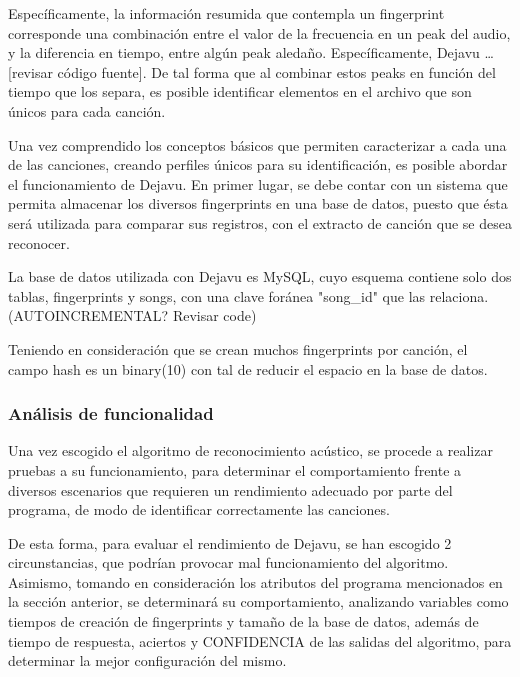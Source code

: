 \bigskip

Específicamente, la información resumida que contempla un fingerprint corresponde una combinación entre el valor de la frecuencia en un peak del audio, y la diferencia en tiempo, entre algún peak aledaño. Específicamente, Dejavu …[revisar código fuente]. De tal forma que al combinar estos peaks en función del tiempo que los separa, es posible identificar elementos en el archivo que son únicos para cada canción.

\bigskip

Una vez comprendido los conceptos básicos que permiten caracterizar a cada una de las canciones, creando perfiles únicos para su identificación, es posible abordar el funcionamiento de Dejavu. En primer lugar, se debe contar con un sistema que permita almacenar los diversos fingerprints en una base de datos, puesto que ésta será utilizada para comparar sus registros, con el extracto de canción que se desea reconocer.

\bigskip

La base de datos utilizada con Dejavu es MySQL, cuyo esquema contiene solo dos tablas, fingerprints y songs, con una clave foránea "song\_id" que las relaciona. (AUTOINCREMENTAL? Revisar code)


\bigskip


Teniendo en consideración que se crean muchos fingerprints por canción, el campo hash es un binary(10) con tal de reducir el espacio en la base de datos.

\subsubsection{Análisis de funcionalidad}
Una vez escogido el algoritmo de reconocimiento acústico, se procede a realizar pruebas a su funcionamiento, para determinar el comportamiento frente a diversos escenarios que requieren un rendimiento adecuado por parte del programa, de modo de identificar correctamente las canciones.

De esta forma, para evaluar el rendimiento de Dejavu, se han escogido 2 circunstancias, que podrían provocar mal funcionamiento del algoritmo. Asimismo, tomando en consideración los atributos del programa mencionados en la sección anterior, se determinará su comportamiento, analizando variables como tiempos de creación de fingerprints y tamaño de la base de datos, además de tiempo de respuesta, aciertos y CONFIDENCIA de las salidas del algoritmo, para determinar la mejor configuración del mismo.

